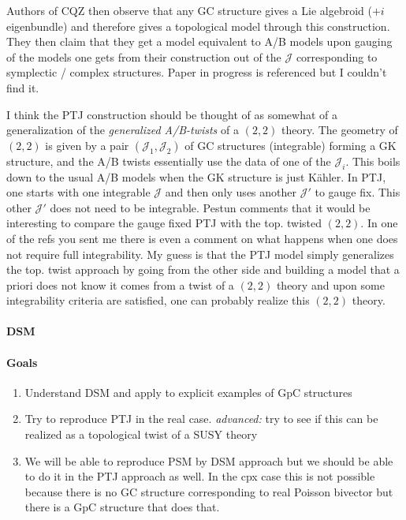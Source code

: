 \documentclass{article}
\newcommand{\JJ}{\mathcal{J}}
\theoremstyle{definition}
\theoremstyle{definition}
\theoremstyle{remark}
\theoremstyle{ref}
\begin{document}
Authors of CQZ then observe that any GC structure gives a Lie algebroid ($+i$ eigenbundle) and therefore gives a topological model through this construction. They then claim that they get a model equivalent to A/B models upon gauging of the models one gets from their construction out of the $\JJ$ corresponding to symplectic / complex structures. Paper in progress is referenced but I couldn't find it.

I think the PTJ construction should be thought of as somewhat of a generalization of the {\it generalized A/B-twists} of a $(2,2)$ theory. The geometry of $(2,2)$ is given by a pair $(\JJ_1,\JJ_2)$ of GC structures (integrable) forming a GK structure, and the A/B twists essentially use the data of one of the $\JJ_i$. This boils down to the usual A/B models when the GK structure is just K\"ahler. In PTJ, one starts with one integrable $\JJ$ and then only uses another $\JJ'$ to gauge fix. This other $\JJ'$ does not need to be integrable. Pestun comments that it would be interesting to compare the gauge fixed PTJ with the top. twisted $(2,2)$. In one of the refs you sent me there is even a comment on what happens when one does not require full integrability. My guess is that the PTJ model simply generalizes the top. twist approach by going from the other side and building a model that a priori does not know it comes from a twist of a $(2,2)$ theory and upon some integrability criteria are satisfied, one can probably realize this $(2,2)$ theory.

\paragraph*{DSM}


\paragraph*{Goals}
\begin{enumerate}
\item Understand DSM and apply to explicit examples of GpC structures
\item Try to reproduce PTJ in the real case. {\it advanced:} try to see if this can be realized as a topological twist of a SUSY theory
\item We will be able to reproduce PSM by DSM approach but we should be able to do it in the PTJ approach as well. In the cpx case this is not possible because there is no GC structure corresponding to real Poisson bivector but there is a GpC structure that does that.
\end{enumerate}
\end{document}
